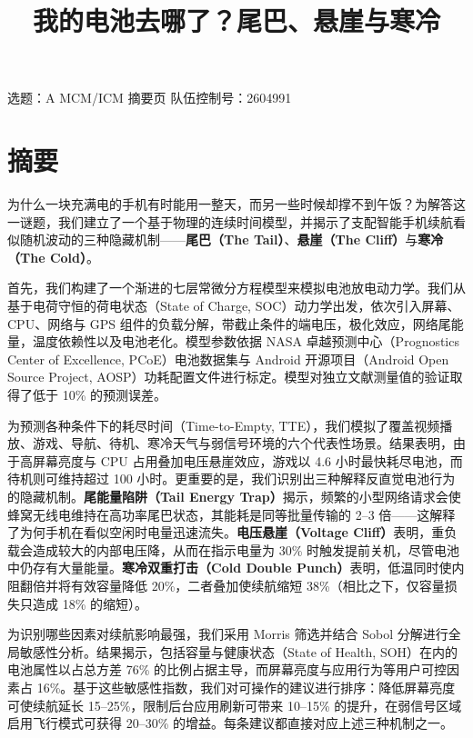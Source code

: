 \documentclass[11pt,a4paper]{ctexart}
\title{我的电池去哪了？尾巴、悬崖与寒冷}
\author{}
\date{}
\begin{document}
\maketitle

\begin{center}
\small 选题：A  MCM/ICM 摘要页 \quad 队伍控制号：2604991
\end{center}
\vspace{0.5em}

\section*{摘要}

为什么一块充满电的手机有时能用一整天，而另一些时候却撑不到午饭？为解答这一谜题，我们建立了一个基于物理的连续时间模型，并揭示了支配智能手机续航看似随机波动的三种隐藏机制——\textbf{尾巴（The Tail）}、\textbf{悬崖（The Cliff）}与\textbf{寒冷（The Cold）}。

首先，我们构建了一个渐进的七层常微分方程模型来模拟电池放电动力学。我们从基于电荷守恒的荷电状态（State of Charge, SOC）动力学出发，依次引入屏幕、CPU、网络与 GPS 组件的负载分解，带截止条件的端电压，极化效应，网络尾能量，温度依赖性以及电池老化。模型参数依据 NASA 卓越预测中心（Prognostics Center of Excellence, PCoE）电池数据集与 Android 开源项目（Android Open Source Project, AOSP）功耗配置文件进行标定。模型对独立文献测量值的验证取得了低于 10\% 的预测误差。

为预测各种条件下的耗尽时间（Time-to-Empty, TTE），我们模拟了覆盖视频播放、游戏、导航、待机、寒冷天气与弱信号环境的六个代表性场景。结果表明，由于高屏幕亮度与 CPU 占用叠加电压悬崖效应，游戏以 4.6 小时最快耗尽电池，而待机则可维持超过 100 小时。更重要的是，我们识别出三种解释反直觉电池行为的隐藏机制。\textbf{尾能量陷阱（Tail Energy Trap）}揭示，频繁的小型网络请求会使蜂窝无线电维持在高功率尾巴状态，其能耗是同等批量传输的 2--3 倍——这解释了为何手机在看似空闲时电量迅速流失。\textbf{电压悬崖（Voltage Cliff）}表明，重负载会造成较大的内部电压降，从而在指示电量为 30\% 时触发提前关机，尽管电池中仍存有大量能量。\textbf{寒冷双重打击（Cold Double Punch）}表明，低温同时使内阻翻倍并将有效容量降低 20\%，二者叠加使续航缩短 38\%（相比之下，仅容量损失只造成 18\% 的缩短）。

为识别哪些因素对续航影响最强，我们采用 Morris 筛选并结合 Sobol 分解进行全局敏感性分析。结果揭示，包括容量与健康状态（State of Health, SOH）在内的电池属性以占总方差 76\% 的比例占据主导，而屏幕亮度与应用行为等用户可控因素占 16\%。基于这些敏感性指数，我们对可操作的建议进行排序：降低屏幕亮度可使续航延长 15--25\%，限制后台应用刷新可带来 10--15\% 的提升，在弱信号区域启用飞行模式可获得 20--30\% 的增益。每条建议都直接对应上述三种机制之一。
\end{document}
